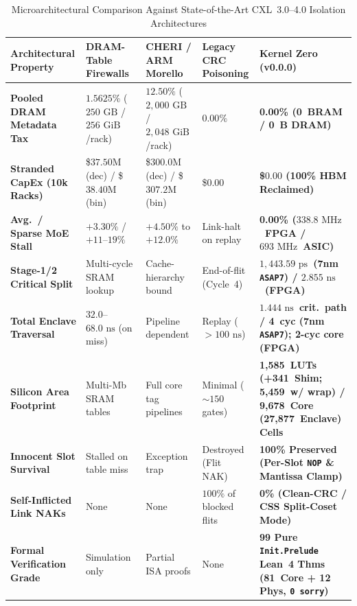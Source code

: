 \documentclass[11pt,letterpaper]{article}
\renewcommand{\arraystretch}{1.22}
\providecommand{\LeanTheoremTotal}{81}
\providecommand{\CoreClbLuts}{1,585}
\providecommand{\ScrubShimLuts}{341}
\providecommand{\WrapperLuts}{5,459}
\providecommand{\StageTwoNs}{\ensuremath{2.855\text{~ns}}}
\providecommand{\CoreFmax}{\ensuremath{338.8\text{~MHz}}}
\providecommand{\AsicCoreCells}{9,678}
\providecommand{\AsicStandardCells}{27,877}
\providecommand{\AsicStageOneTwoDelayPs}{\ensuremath{1,443.59\text{~ps}}}
\providecommand{\AsicFourStageDelayNs}{\ensuremath{1.444\text{~ns}}}
\providecommand{\AsicFmaxMhz}{\ensuremath{693\text{~MHz}}}
\providecommand{\CorePhysicalLUTs}{\CoreClbLuts}
\providecommand{\ScrubShimPhysicalLUTs}{\ScrubShimLuts}
\providecommand{\WrapperEnclaveLUTs}{\WrapperLuts}
\providecommand{\CoreBRAM}{0}
\providecommand{\StageTwoCriticalPathNs}{\StageTwoNs}
\providecommand{\PostRouteFmaxMHz}{\CoreFmax}
\theoremstyle{spectralthm}
\begin{document}
\begin{table}[!tp]
\centering
\footnotesize
\setlength{\tabcolsep}{4.5pt}
\renewcommand{\arraystretch}{1.22}
\caption{Microarchitectural Comparison Against State-of-the-Art CXL~3.0--4.0 Isolation Architectures}
\label{tab:comparison}
\begin{tabularx}{\textwidth}{@{}>{\raggedright\hyphenpenalty=10000\arraybackslash}p{1.38in} >{\raggedright\arraybackslash}X >{\raggedright\arraybackslash}X >{\raggedright\arraybackslash}X >{\raggedright\arraybackslash}X@{}}
\toprule
\textbf{Architectural Property} & \textbf{DRAM-Table Firewalls~\cite{goswami2026spacecontrol}} & \textbf{CHERI / ARM Morello~\cite{watson2015cheri}} & \textbf{Legacy CRC Poisoning} & \textbf{Kernel Zero (v0.0.0)} \\
\midrule
\textbf{Pooled DRAM Metadata Tax} & $1.5625\%$ ($250\text{~GB}$ / $256\text{~GiB}$/rack) & $12.50\%$ ($2,000\text{~GB}$ / $2,048\text{~GiB}$/rack) & $0.00\%$ & \textbf{0.00\% (\CoreBRAM\ BRAM / 0~B DRAM)} \\
\textbf{Stranded CapEx (10k Racks)} & \$$37.50\text{M}$ (dec) / \$$38.40\text{M}$ (bin) & \$$300.0\text{M}$ (dec) / \$$307.2\text{M}$ (bin) & \$$0.00$ & \textbf{\$$0.00$ (100\% HBM Reclaimed)} \\
\addlinespace[3pt]
\textbf{Avg.\ / Sparse MoE Stall} & $+3.30\%$ / $+11$--$19\%$ & $+4.50\%$ to $+12.0\%$ & Link-halt on replay & \textbf{0.00\% (\PostRouteFmaxMHz\ FPGA / \AsicFmaxMhz\ ASIC)} \\
\textbf{Stage-1/2 Critical Split} & Multi-cycle SRAM lookup & Cache-hierarchy bound & End-of-flit (Cycle~4) & \textbf{\AsicStageOneTwoDelayPs\ (7nm \texttt{ASAP7}) / \StageTwoCriticalPathNs\ (FPGA)} \\
\textbf{Total Enclave Traversal} & $32.0$--$68.0\text{~ns}$ (on miss) & Pipeline dependent & Replay ($>100\text{~ns}$) & \textbf{\AsicFourStageDelayNs\ crit.\ path / 4~cyc (7nm \texttt{ASAP7}); 2-cyc core (FPGA)} \\
\addlinespace[3pt]
\textbf{Silicon Area Footprint} & Multi-Mb SRAM tables & Full core tag pipelines & Minimal ($\sim 150$ gates) & \textbf{\CorePhysicalLUTs\ LUTs (+\ScrubShimPhysicalLUTs\ Shim; \WrapperEnclaveLUTs\ w/ wrap) / \AsicCoreCells\ Core (\AsicStandardCells\ Enclave) Cells} \\
\textbf{Innocent Slot Survival} & Stalled on table miss & Exception trap & Destroyed (Flit NAK) & \textbf{100\% Preserved (Per-Slot \texttt{NOP} \& Mantissa Clamp)} \\
\textbf{Self-Inflicted Link NAKs} & None & None & $100\%$ of blocked flits & \textbf{0\% (Clean-CRC / CSS Split-Coset Mode)} \\
\textbf{Formal Verification Grade} & Simulation only & Partial ISA proofs & None & \textbf{99 Pure \texttt{Init.Prelude} Lean~4 Thms (\LeanTheoremTotal\ Core + 12 Phys, \texttt{0 sorry})} \\
\bottomrule
\end{tabularx}
\end{table}
\end{document}
